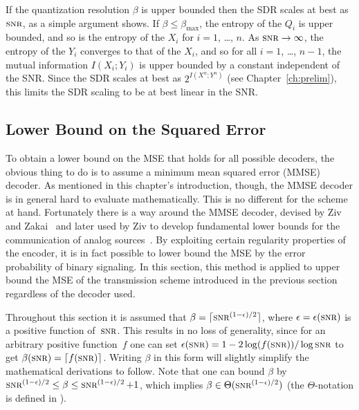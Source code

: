 \begin{remark}
  \label{rem:betagrow}
  If the quantization resolution $\beta$ is upper bounded then the SDR scales at
  best as $\snr$, as a simple argument shows. If $\beta \le \beta_{\max}$, the
  entropy of the $Q_i$ is upper bounded, and so is the entropy of the $X_i$ for
  $i = 1$, \ldots, $n$. As $\snr \goesto \infty$, the entropy of the $Y_i$
  converges to that of the $X_i$, and so for all $i = 1$, \ldots, $n-1$, the
  mutual information $I(X_i; Y_i)$ is upper bounded by a constant independent of
  the SNR. Since the SDR scales at best as $2^{I(X^n;Y^n)}$ (see
  Chapter~\ref{ch:prelim}), this limits the SDR scaling to be at best linear in
  the SNR.
\end{remark}


\subsection{Lower Bound on the Squared Error}\label{sec:scalarlowerbound}

To obtain a lower bound on the MSE that holds for all possible decoders, the
obvious thing to do is to assume a minimum mean squared error (MMSE) decoder. As
mentioned in this chapter's introduction, though, the MMSE decoder is in general
hard to evaluate mathematically. This is no different for the scheme at hand.
Fortunately there is a way around the MMSE decoder, devised by Ziv and
Zakai~\cite{ZivZ1969} and later used by Ziv to develop fundamental lower bounds
for the communication of analog sources~\cite{Ziv1970}. By exploiting certain
regularity properties of the encoder, it is in fact possible to lower bound the
MSE by the error probability of binary signaling. In this section, this method
is applied to upper bound the MSE of the transmission scheme introduced in the
previous section regardless of the decoder used. 

\begin{remark}
  \label{rem:betaepswlog}
  Throughout this section it is assumed that $\beta = \lceil \snr^{(1-\e)/2}\rceil$,
  where $\e = \e(\snr)$ is a positive function of~$\snr$. This results in no
  loss of generality, since for an arbitrary positive function~$f$ one can set
  $\e(\snr) = 1-2 \log(f(\snr))/\log\snr$ to get $\beta(\snr) = \lceil f(\snr)
  \rceil$.  Writing $\beta$ in this form will slightly simplify the mathematical
  derivations to follow. Note that one can bound $\beta$ by $\snr^{(1-\e)/2} \le
  \beta \le \snr^{(1-\e)/2} + 1$, which implies $\beta \in
  \Theta(\snr^{(1-\e)/2})$ (the $\Theta$-notation is defined in
  ).
\end{remark}

